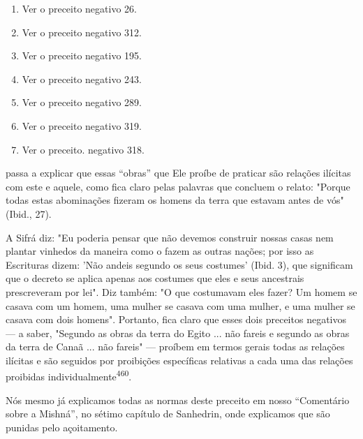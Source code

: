 \begin{enumerate}
\def\labelenumi{\arabic{enumi}.}
\setcounter{enumi}{452}
\item
 
 Ver o preceito negativo 26.
 
\item
 
 Ver o preceito negativo 312.
 
\item
 
 Ver o preceito negativo 195.
 
\item
 
 Ver o preceito negativo 243.
 
\item
 
 Ver o preceito negativo 289.
 
\item
 
 Ver o preceito negativo 319.
 
\item
 
 Ver o preceito. negativo 318.
 
\end{enumerate}



passa a explicar que essas ``obras'' que Ele proíbe de praticar são
relações ilíci­tas com este e aquele, como fica claro pelas palavras que
concluem o relato: "Porque todas estas abominações fizeram os homens da
terra que estavam an­tes de vós" (Ibid., 27).

A Sifrá diz: "Eu poderia pensar que não devemos construir nossas casas
nem plantar vinhedos da maneira como o fazem as outras nações; por isso
as Escrituras dizem: 'Não andeis segundo os seus costumes' (Ibid. 3),
que significam que o decreto se aplica apenas aos costumes que eles e
seus ances­trais prescreveram por lei". Diz também: "O que costumavam
eles fazer? Um homem se casava com um homem, uma mulher se casava com
uma mulher, e uma mulher se casava com dois homens". Portanto, fica
claro que esses dois preceitos negativos --- a saber, "Segundo as obras
da terra do Egito ... não fa­reis e segundo as obras da terra de Canaã
... não fareis" --- proíbem em termos gerais todas as relações ilícitas
e são seguidos por proibições específicas relati­vas a cada uma das
relações proibidas individualmente\textsuperscript{460}.

Nós mesmo já explicamos todas as normas deste preceito em nosso
``Comentário sobre a Mishná'', no sétimo capítulo de Sanhedrin, onde
explica­mos que são punidas pelo açoitamento.

